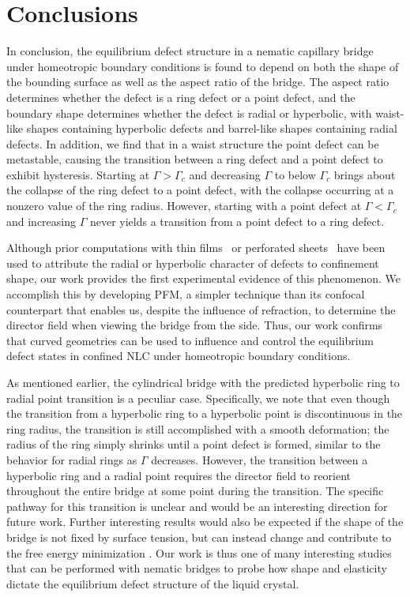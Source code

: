 \section{Conclusions}
In conclusion, the equilibrium defect structure in a nematic capillary bridge under homeotropic boundary conditions is found to depend on both the shape of the bounding surface as well as the aspect ratio of the bridge.
The aspect ratio determines whether the defect is a ring defect or a point defect, and the boundary shape determines whether the defect is radial or hyperbolic, with waist-like shapes containing hyperbolic defects and barrel-like shapes containing radial defects.
In addition, we find that in a waist structure the point defect can be metastable,  causing the transition between a ring defect and a point defect to exhibit hysteresis.
Starting at $\Gamma > \Gamma_c$ and decreasing $\Gamma$ to below $\Gamma_c$ brings about the collapse of the ring defect to a point defect, with the collapse occurring at a nonzero value of the ring radius.
However, starting with a point defect at $\Gamma < \Gamma_c$ and increasing $\Gamma$ never yields a transition from a point defect to a ring defect.

Although prior computations with thin films~\cite{RN141} or perforated sheets~\cite{RN149} have been used to attribute the radial or hyperbolic character of defects to confinement shape, our work provides the first experimental evidence of this phenomenon.
We accomplish this by developing PFM, a simpler technique than its confocal counterpart that enables us, despite the influence of refraction, to determine the director field when viewing the bridge from the side.
Thus, our work confirms that curved geometries can be used to influence and control the equilibrium defect states in confined NLC under homeotropic boundary conditions.

As mentioned earlier, the cylindrical bridge with the predicted hyperbolic ring to radial point transition is a peculiar case.
Specifically, we note that even though the transition from a hyperbolic ring to a hyperbolic point is discontinuous in the ring radius, the transition is still accomplished with a smooth deformation; the radius of the ring simply shrinks until a point defect is formed, similar to the behavior for radial rings as $\Gamma$ decreases.
However, the transition between a hyperbolic ring and a radial point requires the director field to reorient throughout the entire bridge at some point during the transition.
The specific pathway for this transition is unclear and would be an interesting direction for future work.
Further interesting results would also be expected if the shape of the bridge is not fixed by surface tension, but can instead change and contribute to the free energy minimization \cite{RN12}.
Our work is thus one of many interesting studies that can be performed with nematic bridges to probe how shape and elasticity dictate the equilibrium defect structure of the liquid crystal.
